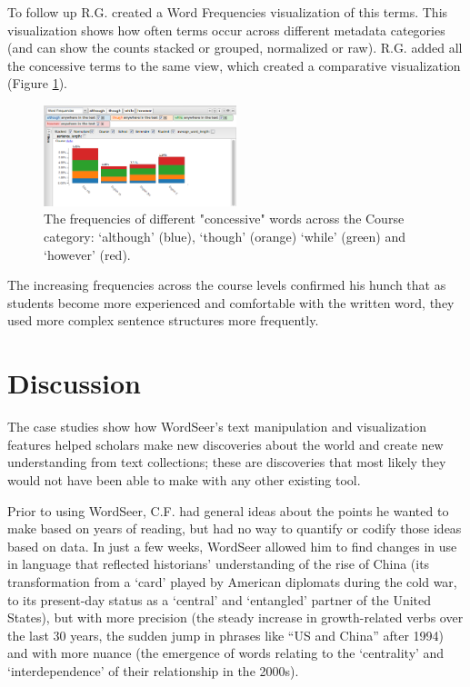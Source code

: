 \documentclass{sig-alternate}
\begin{document}
To follow up R.G. created a Word Frequencies visualization of this terms. This visualization shows how often terms occur across different metadata categories (and can show the counts stacked or grouped, normalized or raw). R.G. added all the concessive terms to the same view, which created a comparative visualization (Figure \ref{fig:rex05}).
\begin{figure}[h!]
\includegraphics[width=0.5\textwidth]{fig/rex/05.png}
\caption{The frequencies of different "concessive" words across the Course category: `although' (blue), `though' (orange) `while' (green) and `however' (red). \label{fig:rex05}}
\end{figure}
The increasing frequencies across the course levels confirmed his hunch that as students become more experienced and comfortable with the written word, they used more complex sentence structures more frequently. 

\section{Discussion}
The case studies show how WordSeer's text manipulation and visualization features helped scholars make new discoveries about the world and create new understanding from text collections; these are discoveries that most likely they would not have been able to make with any other existing tool.

Prior to using WordSeer, C.F. had general ideas about the points he wanted to make based on years of reading, but had no way to quantify or codify those ideas based on data.  In just a few weeks, WordSeer allowed him to find changes in use in language that reflected historians' understanding of the rise of China (its transformation from a `card' played by American diplomats during the cold war,  to its present-day status as a `central' and `entangled' partner of the United States), but with more precision (the steady increase in growth-related verbs over the last 30 years, the sudden jump in  phrases like ``US and China'' after 1994) and with more nuance (the emergence of words relating to the `centrality' and `interdependence'  of their relationship in the 2000s).
\end{document}
